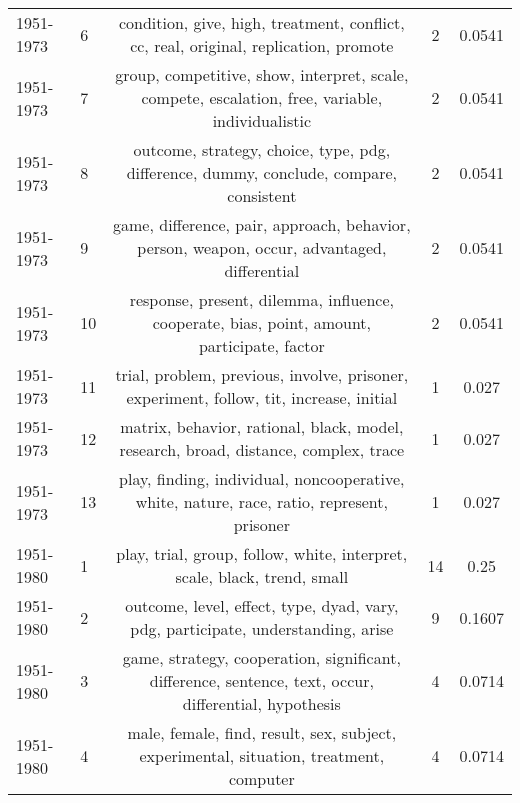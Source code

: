 \begin{tabular}{llccc}
 1951-1973 &               6 &                          condition, give, high, treatment, conflict, cc, real, original, replication, promote &                2 &                  0.0541 \\
 1951-1973 &               7 &              group, competitive, show, interpret, scale, compete, escalation, free, variable, individualistic &                2 &                  0.0541 \\
 1951-1973 &               8 &                        outcome, strategy, choice, type, pdg, difference, dummy, conclude, compare, consistent &                2 &                  0.0541 \\
 1951-1973 &               9 &                   game, difference, pair, approach, behavior, person, weapon, occur, advantaged, differential &                2 &                  0.0541 \\
 1951-1973 &              10 &                    response, present, dilemma, influence, cooperate, bias, point, amount, participate, factor &                2 &                  0.0541 \\
 1951-1973 &              11 &                       trial, problem, previous, involve, prisoner, experiment, follow, tit, increase, initial &                1 &                   0.027 \\
 1951-1973 &              12 &                           matrix, behavior, rational, black, model, research, broad, distance, complex, trace &                1 &                   0.027 \\
 1951-1973 &              13 &                    play, finding, individual, noncooperative, white, nature, race, ratio, represent, prisoner &                1 &                   0.027 \\
 \midrule
 1951-1980 &               1 &                                      play, trial, group, follow, white, interpret, scale, black, trend, small &               14 &                    0.25 \\
 1951-1980 &               2 &                              outcome, level, effect, type, dyad, vary, pdg, participate, understanding, arise &                9 &                  0.1607 \\
 1951-1980 &               3 &         game, strategy, cooperation, significant, difference, sentence, text, occur, differential, hypothesis &                4 &                  0.0714 \\
 1951-1980 &               4 &                        male, female, find, result, sex, subject, experimental, situation, treatment, computer &                4 &                  0.0714 \\

\end{tabular}
